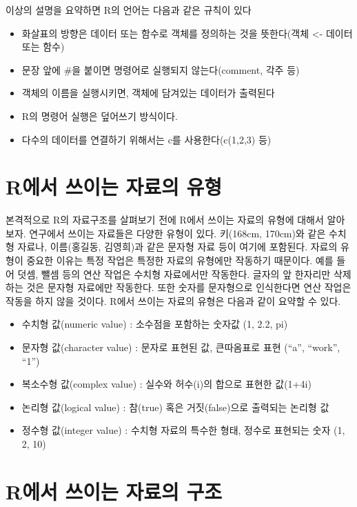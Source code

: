 \documentclass[
]{book}
\providecommand{\tightlist}{%
  \setlength{\itemsep}{0pt}\setlength{\parskip}{0pt}}
\begin{document}
이상의 설명을 요약하면 R의 언어는 다음과 같은 규칙이 있다

\begin{itemize}
\tightlist
\item
  화살표의 방향은 데이터 또는 함수로 객체를 정의하는 것을 뜻한다(객체 \textless- 데이터 또는 함수)
\item
  문장 앞에 \#을 붙이면 명령어로 실행되지 않는다(comment, 각주 등)
\item
  객체의 이름을 실행시키면, 객체에 담겨있는 데이터가 출력된다
\item
  R의 명령어 실행은 덮어쓰기 방식이다.
\item
  다수의 데이터를 연결하기 위해서는 c를 사용한다(c(1,2,3) 등)
\end{itemize}

\section{R에서 쓰이는 자료의 유형}\label{ruxc5d0uxc11c-uxc4f0uxc774uxb294-uxc790uxb8ccuxc758-uxc720uxd615}

본격적으로 R의 자료구조를 살펴보기 전에 R에서 쓰이는 자료의 유형에 대해서 알아보자. 연구에서 쓰이는 자료들은 다양한 유형이 있다. 키(168cm, 170cm)와 같은 수치형 자료나, 이름(홍길동, 김영희)과 같은 문자형 자료 등이 여기에 포함된다. 자료의 유형이 중요한 이유는 특정 작업은 특정한 자료의 유형에만 작동하기 때문이다. 예를 들어 덧셈, 뺄셈 등의 연산 작업은 수치형 자료에서만 작동한다. 글자의 앞 한자리만 삭제하는 것은 문자형 자료에만 작동한다. 또한 숫자를 문자형으로 인식한다면 연산 작업은 작동을 하지 않을 것이다. R에서 쓰이는 자료의 유형은 다음과 같이 요약할 수 있다.

\begin{itemize}
\tightlist
\item
  수치형 값(numeric value) : 소수점을 포함하는 숫자값 (1, 2.2, pi)
\item
  문자형 값(character value) : 문자로 표현된 값, 큰따옴표로 표현 (``a'', ``work'', ``1'')
\item
  복소수형 값(complex value) : 실수와 허수(i)의 합으로 표현한 값(1+4i)
\item
  논리형 값(logical value) : 참(true) 혹은 거짓(false)으로 출력되는 논리형 값
\item
  정수형 값(integer value) : 수치형 자료의 특수한 형태, 정수로 표현되는 숫자 (1, 2, 10)
\end{itemize}

\section{R에서 쓰이는 자료의 구조}\label{ruxc5d0uxc11c-uxc4f0uxc774uxb294-uxc790uxb8ccuxc758-uxad6cuxc870}
\end{document}
